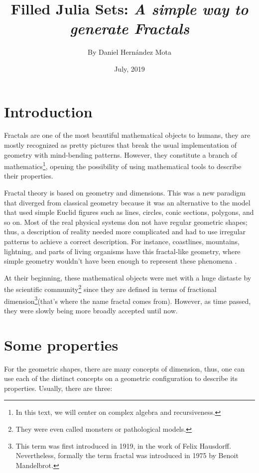 \documentclass{article}
\title{Filled Julia Sets: \textit{A simple way to generate Fractals}}
\author{By Daniel Hernández Mota}
\date{July, 2019}
\begin{document}
\maketitle

\section{Introduction}

Fractals are one of the most beautiful mathematical objects to humans, they are mostly recognized as pretty pictures that break the usual implementation of geometry with mind-bending patterns. However, they constitute a branch of mathematics\footnote{In this text, we will center on complex algebra and recursiveness.}, opening the possibility of using mathematical tools to describe their properties\cite{Edyta}. 

Fractal theory is based on geometry and dimensions. This was a new paradigm that diverged from classical geometry because it was an alternative to the model that used simple Euclid figures such as lines, circles, conic sections, polygons, and so on. Most of the real physical systems don not have regular geometric shapes; thus, a description of reality needed more complicated and had to use irregular patterns to achieve a correct description\cite{Crownover}. For instance, coastlines, mountains, lightning, and parts of living organisms have this fractal-like geometry, where simple geometry wouldn't have been enough to represent these phenomena \cite{Edyta}.

At their beginning, these mathematical objects were met with a huge distaste by the scientific community\footnote{They were even called monsters or pathological models.} since they are defined in terms of fractional dimension\footnote{This term was first introduced in 1919, in the work of Felix Hausdorff. Nevertheless, formally the term fractal was introduced in 1975 by Benoit Mandelbrot.}(that's where the name fractal comes from). However, as time passed, they were slowly being more broadly accepted until now. 
\newpage
\section{Some properties}
For the geometric shapes, there are many concepts of dimension, thus, one can use each of the distinct concepts on a geometric configuration to describe its properties. Usually, there are three\cite{Crownover}:
\end{document}
